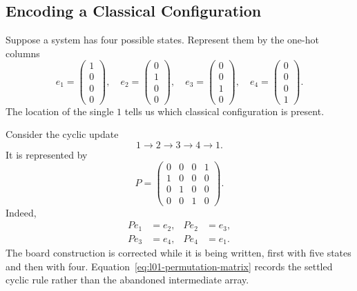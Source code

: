 \subsection{Encoding a Classical Configuration}

Suppose a system has four possible states. Represent them by the one-hot columns
\begin{equation}
  e_1=
  \begin{pmatrix}1\\0\\0\\0\end{pmatrix},
  \quad
  e_2=
  \begin{pmatrix}0\\1\\0\\0\end{pmatrix},
  \quad
  e_3=
  \begin{pmatrix}0\\0\\1\\0\end{pmatrix},
  \quad
  e_4=
  \begin{pmatrix}0\\0\\0\\1\end{pmatrix}.
  \label{eq:l01-one-hot}
\end{equation}
The location of the single \(1\) tells us which classical configuration is present.

Consider the cyclic update
\begin{equation}
  1\longrightarrow2\longrightarrow3\longrightarrow4\longrightarrow1.
  \label{eq:l01-four-cycle}
\end{equation}
It is represented by
\begin{equation}
  P=
  \begin{pmatrix}
    0&0&0&1\\
    1&0&0&0\\
    0&1&0&0\\
    0&0&1&0
  \end{pmatrix}.
  \label{eq:l01-permutation-matrix}
\end{equation}
Indeed,
\begin{equation}
  \begin{aligned}
    Pe_1&=e_2, & Pe_2&=e_3,\\
    Pe_3&=e_4, & Pe_4&=e_1.
  \end{aligned}
\end{equation}
The board construction is corrected while it is being written, first with five states and then with four. Equation~\eqref{eq:l01-permutation-matrix} records the settled cyclic rule rather than the abandoned intermediate array.


